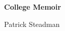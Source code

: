 \documentclass[12pt]{memoir}
\begin{document}
\vspace*{\fill}
\begin{adjustwidth}{1in}{1in}
\begin{center}
\HUGE \textbf{College Memoir}
\end{center}
\bigskip
\begin{center}
\LARGE{Patrick Steadman}\par
\end{center}
\end{adjustwidth}
\vspace*{\fill}

{}


%

%

%

%


\end{document}
